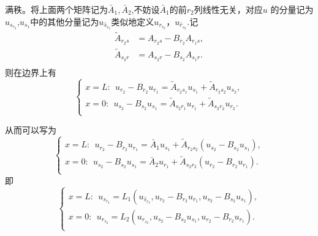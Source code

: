 \documentclass[notitlepage,cs4size,punct,oneside]{ctexrep}
\numberwithin{equation}{chapter}
\theoremstyle{mystyle}
\begin{document}
满秩。将上面两个矩阵记为$\bar{A}_1,\bar{A}_2$,不妨设$\bar{A}_1$的前$r_2$列线性无关，对应$u$ 的分量记为$u_{s_{r_2}}$,$u_{s_1}$中的其他分量记为$u_{\hat{s} _{r_2}}$类似地定义$u_{r_{s_2}}$，$u_{\hat{r} _{s_2}}$.记
$$
\begin{aligned}
	\tilde{A}_{r_2s}&=A_{r_2s}-B_{r_2}A_{r_1s},\\
	\tilde{A}_{s_2r}&=A_{s_2r}-B_{s_2}A_{s_1r}.\\
\end{aligned}
$$
则在边界上有
$$
\left\{ \begin{array}{l}
	x=L:\ \ u_{r_2}-B_{r_2}u_{r_1}=\tilde{A}_{r_2s_1}u_{s_1}+\tilde{A}_{r_2s_2}u_{s_2},\\
	x=0:\ \ u_{s_2}-B_{s_2}u_{s_1}=\tilde{A}_{s_2r_1}u_{r_1}+\tilde{A}_{s_2r_2}u_{r_2}.\\
\end{array} \right. 
$$

从而可以写为
$$
\left\{ \begin{array}{l}
	x=L:\ \ u_{r_2}-B_{r_2}u_{r_1}=\bar{A}_1 u_{s_1}+\tilde{A}_{r_2s_2}(u_{s_2} - B_{s_2}u_{s_1}),\\
	x=0:\ \ u_{s_2}-B_{s_2}u_{s_1}=\bar{A}_2 u_{r_1}+\tilde{A}_{s_2r_2}(u_{r_2} - B_{r_2}u_{r_1}).\\
\end{array} \right. 
$$
即
$$
\left\{ \begin{array}{l}
	x=L:\ \ u_{s_{r_2}} =L_1\left( u_{\hat{s} _{r_2}} ,u_{r_2}-B_{r_2}u_{r_1} ,u_{s_2} - B_{s_2}u_{s_1}  \right)    ,\\
	x=0:\ \ u_{r_{s_2}} =L_2\left( u_{\hat{r} _{s_2}} ,u_{s_2}-B_{s_2}u_{s_1} ,u_{r_2} - B_{r_2}u_{r_1}  \right)  .\\
\end{array} \right. 
$$
\end{document}
